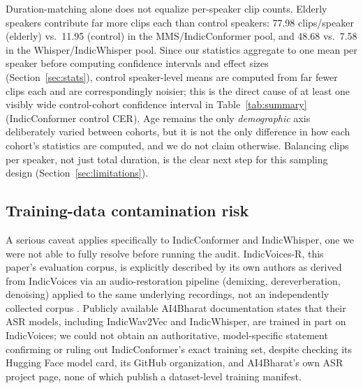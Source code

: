 \documentclass[11pt]{article}
\begin{document}
Duration-matching alone does not equalize per-speaker clip counts. Elderly
speakers contribute far more clips each than control speakers: 77.98 clips/speaker (elderly) vs.\
11.95 (control) in the MMS/IndicConformer pool, and 48.68 vs.\ 7.58 in the Whisper/IndicWhisper
pool. Since our statistics aggregate to one mean per speaker before computing confidence intervals
and effect sizes (Section~\ref{sec:stats}), control speaker-level means are computed from far
fewer clips each and are correspondingly noisier; this is the direct cause of at least one
visibly wide control-cohort confidence interval in Table~\ref{tab:summary} (IndicConformer
control CER). Age remains the only \emph{demographic} axis deliberately varied between cohorts,
but it is not the only difference in how each cohort's statistics are computed, and we do not
claim otherwise. Balancing clips per speaker, not just total duration, is the clear next step for
this sampling design (Section~\ref{sec:limitations}).

\subsection{Training-data contamination risk}
\label{sec:contamination}

A serious caveat applies specifically to IndicConformer and IndicWhisper, one we were not able to
fully resolve before running the audit. IndicVoices-R, this paper's evaluation corpus, is
explicitly described by its own authors as derived from IndicVoices \citep{indicvoices2024} via an
audio-restoration pipeline (demixing, dereverberation, denoising) applied to the same underlying
recordings, not an independently collected corpus \citep{indicvoicesr}. Publicly available
AI4Bharat documentation states that their ASR models, including IndicWav2Vec and IndicWhisper, are
trained in part on IndicVoices; we could not obtain an authoritative, model-specific statement
confirming or ruling out IndicConformer's exact training set, despite checking its Hugging Face
model card, its GitHub organization, and AI4Bharat's own ASR project page, none of which publish a
dataset-level training manifest.
\end{document}
